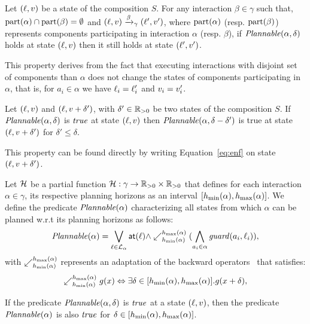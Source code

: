 \begin{property}\label{pt:plnIn1}
  Let $(\ell,v)$ be a state of the composition $S$. For any interaction $\beta\in\gamma$ such that, $\mathrm{part}(\alpha)\cap\mathrm{part}(\beta)=\emptyset$
  and $(\ell,v)\xrightarrow{\beta}_{\gamma}(\ell',v')$, where $\mathrm{part}(\alpha)$ (resp. $\mathrm{part}(\beta)$) represents components participating in 
  interaction $\alpha$ (resp. $\beta$), if $\mathit{Plannable(\alpha,\delta)}$ holds at state $(\ell,v)$ then it still holds at state $(\ell',v')$.
\end{property}
This property derives from the fact that executing interactions with disjoint set of components than $\alpha$ does not change the states
of components participating in $\alpha$, that is, for $a_i\in\alpha$ we have $\ell_i=\ell'_i$ and $v_i=v'_i$.


\begin{property}\label{pt:plnIn2}
  Let $(\ell,v)$ and $(\ell,v+\delta')$, with $\delta'\in\mathbb R_{> 0}$ be two states of the composition $S$. 
  If $\mathit{Plannable(\alpha,\delta)}$ is $\textnormal{\textit{true}}$ at state $(\ell,v)$ then $\mathit{Plannable(\alpha,\delta-\delta')}$ is true at state
  $(\ell,v+\delta')$ for $\delta'\le\delta$.
\end{property}
This property can be found directly by writing Equation~\ref{eq:enf} on state $(\ell,v+\delta')$.

Let $\mathcal{H}$ be a partial function $\mathcal{H}: \gamma \to\mathbb R_{> 0}\times\mathbb R_{> 0}$ that defines for each
interaction $\alpha\in\gamma$, its respective planning horizons as an interval $[h_{\min}(\alpha),h_{\max}(\alpha)]$. 
We define the predicate $\mathit{Plannable(\alpha)}$ characterizing all states from which 
$\alpha$ can be planned w.r.t its planning horizons as follows:  
\begin{displaymath}
  \mathit{Plannable(\alpha)}=\bigvee_{\ell\in\mathcal{L}_{\alpha}} \textnormal{\textsf{at}}(\ell)\wedge\swarrow^{h_{\max}(\alpha)}_{h_{\min}(\alpha)}(\bigwedge_{a_i\in\alpha} \mathit{guard}(a_i,\ell_i)),
\end{displaymath}
  with $\swarrow^{h_{\max}(\alpha)}_{h_{\min}(\alpha)}$ represents an adaptation of the backward operators~\cite{tripakis98:thesis} that satisfies:
\begin{displaymath}
\swarrow^{h_{\max}(\alpha)}_{h_{\min}(\alpha)}g(x)\Leftrightarrow\exists\delta\in[h_{\min}(\alpha),h_{\max}(\alpha)].g(x+\delta),
\end{displaymath}
\begin{property}\label{pt:pln}
  If the predicate $\mathit{Plannable(\alpha,\delta)}$ is $\textnormal{\textit{true}}$ at a state $(\ell,v)$, then the 
  predicate $\mathit{Plannable(\alpha)}$ is also $\textnormal{\textit{true}}$ for $\delta\in[h_{\min}(\alpha),h_{\max}(\alpha)]$.
\end{property}

